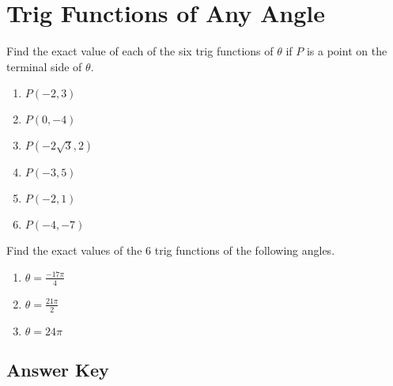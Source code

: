 \chapter{Trig Functions of Any Angle}

Find the exact value of each of the six trig functions of $\theta$ if $P$ is a point on the terminal side of $\theta$.

\begin{enumerate}
	\item $P(-2, 3)$
	\item $P(0,-4)$
	\item $P(-2\sqrt{3}, 2)$
	\item $P(-3, 5)$
	\item $P(-2, 1)$
	\item $P(-4, -7)$
\end{enumerate}	\setcounter{Review}{\value{enumi}}

Find the exact values of the 6 trig functions of the following angles.

\begin{enumerate}		\setcounter{enumi}{\value{Review}}
	\item $\theta = \frac{-17\pi}{4}$
	\item $\theta = \frac{21\pi}{2}$
	\item $\theta = 24\pi$
\end{enumerate}

\newpage

\section{Answer Key}

